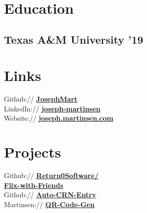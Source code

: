 \documentclass[letterpaper]{deedy-resume} %
\begin{document}
\begin{minipage}[t]{0.33\textwidth} %


\section{Education} 

\subsection{Texas A\&M University '19}


\sectionspace %


\section{Links} 

Github:// \href{https://github.com/JosephMart}{\bf JosephMart} \\
LinkedIn:// \href{https://www.linkedin.com/in/joseph-martinsen}{\bf joseph-martinsen} \\
Website:// \href{http://joseph.martinsen.com}{\bf joseph.martinsen.com} \\
\sectionspace %

\section{Projects} 

Github:// \href{https://github.com/Return0Software/Flix-with-Friends}{\bf Return0Software/ \\ \hspace{41pt}Flix-with-Friends} \\
Github:// \href{https://github.com/JosephMart/Auto-CRN-Entry}{\bf Auto-CRN-Entry} \\
Martinsen:// \href{http://qr.martinsen.com}{\bf QR-Code-Gen}
\sectionspace %


\end{minipage}
\end{document}
